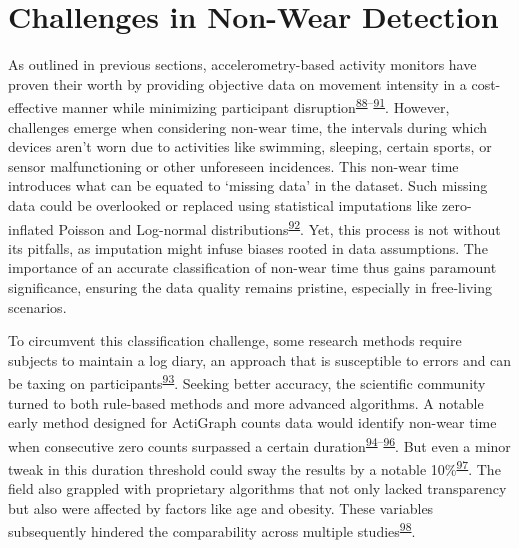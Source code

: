 \documentclass[
  10pt,
]{scrbook}
\begin{document}
\hypertarget{challenges-in-non-wear-detection}{%
\section{Challenges in Non-Wear
Detection}\label{challenges-in-non-wear-detection}}

As outlined in previous sections, accelerometry-based activity monitors
have proven their worth by providing objective data on movement
intensity in a cost-effective manner while minimizing participant
disruption\textsuperscript{\protect\hyperlink{ref-dowd_systematic_2018}{88}--\protect\hyperlink{ref-migueles_comparability_2019}{91}}.
However, challenges emerge when considering non-wear time, the intervals
during which devices aren't worn due to activities like swimming,
sleeping, certain sports, or sensor malfunctioning or other unforeseen
incidences. This non-wear time introduces what can be equated to
`missing data' in the dataset. Such missing data could be overlooked or
replaced using statistical imputations like zero-inflated Poisson and
Log-normal
distributions\textsuperscript{\protect\hyperlink{ref-lee_missing_2018}{92}}.
Yet, this process is not without its pitfalls, as imputation might
infuse biases rooted in data assumptions. The importance of an accurate
classification of non-wear time thus gains paramount significance,
ensuring the data quality remains pristine, especially in free-living
scenarios.

To circumvent this classification challenge, some research methods
require subjects to maintain a log diary, an approach that is
susceptible to errors and can be taxing on
participants\textsuperscript{\protect\hyperlink{ref-ainsworth_recommendations_2012}{93}}.
Seeking better accuracy, the scientific community turned to both
rule-based methods and more advanced algorithms. A notable early method
designed for ActiGraph counts data would identify non-wear time when
consecutive zero counts surpassed a certain
duration\textsuperscript{\protect\hyperlink{ref-hecht_methodology_2009}{94}--\protect\hyperlink{ref-troiano_how_2020}{96}}.
But even a minor tweak in this duration threshold could sway the results
by a notable
10\%\textsuperscript{\protect\hyperlink{ref-aadland_comparison_2018}{97}}.
The field also grappled with proprietary algorithms that not only lacked
transparency but also were affected by factors like age and obesity.
These variables subsequently hindered the comparability across multiple
studies\textsuperscript{\protect\hyperlink{ref-toftager_accelerometer_2013}{98}}.
\end{document}
